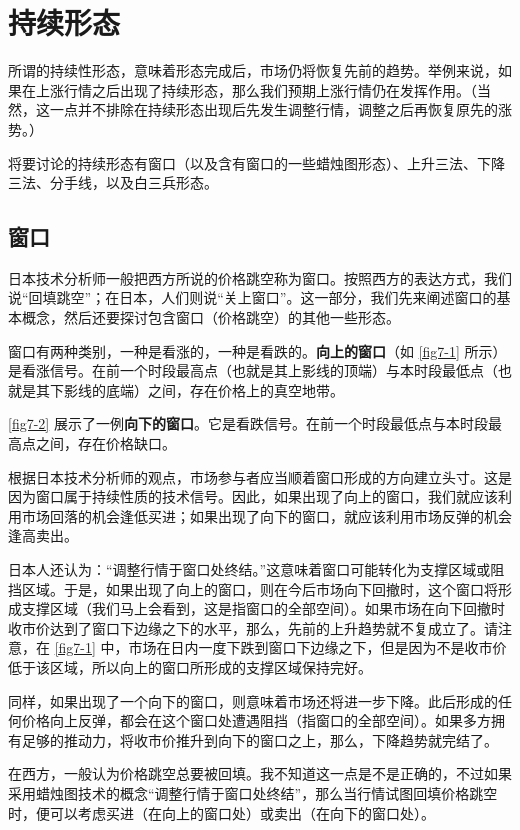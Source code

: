 \chapter{持续形态}
所谓的持续性形态，意味着形态完成后，市场仍将恢复先前的趋势。举例来说，如果在上涨行情之后出现了持续形态，那么我们预期上涨行情仍在发挥作用。（当然，这一点并不排除在持续形态出现后先发生调整行情，调整之后再恢复原先的涨势。）

将要讨论的持续形态有窗口（以及含有窗口的一些蜡烛图形态）、上升三法、下降三法、分手线，以及白三兵形态。

\section{窗口}
日本技术分析师一般把西方所说的价格跳空称为窗口。按照西方的表达方式，我们说“回填跳空”；在日本，人们则说“关上窗口”。这一部分，我们先来阐述窗口的基本概念，然后还要探讨包含窗口（价格跳空）的其他一些形态。

窗口有两种类别，一种是看涨的，一种是看跌的。\textbf{向上的窗口}（如 \autoref{fig7-1} 所示）是看涨信号。在前一个时段最高点（也就是其上影线的顶端）与本时段最低点（也就是其下影线的底端）之间，存在价格上的真空地带。


\autoref{fig7-2} 展示了一例\textbf{向下的窗口}。它是看跌信号。在前一个时段最低点与本时段最高点之间，存在价格缺口。


根据日本技术分析师的观点，市场参与者应当顺着窗口形成的方向建立头寸。这是因为窗口属于持续性质的技术信号。因此，如果出现了向上的窗口，我们就应该利用市场回落的机会逢低买进；如果出现了向下的窗口，就应该利用市场反弹的机会逢高卖出。

日本人还认为：“调整行情于窗口处终结。”这意味着窗口可能转化为支撑区域或阻挡区域。于是，如果出现了向上的窗口，则在今后市场向下回撤时，这个窗口将形成支撑区域（我们马上会看到，这是指窗口的全部空间）。如果市场在向下回撤时收市价达到了窗口下边缘之下的水平，那么，先前的上升趋势就不复成立了。请注意，在 \autoref{fig7-1} 中，市场在日内一度下跌到窗口下边缘之下，但是因为不是收市价低于该区域，所以向上的窗口所形成的支撑区域保持完好。

同样，如果出现了一个向下的窗口，则意味着市场还将进一步下降。此后形成的任何价格向上反弹，都会在这个窗口处遭遇阻挡（指窗口的全部空间）。如果多方拥有足够的推动力，将收市价推升到向下的窗口之上，那么，下降趋势就完结了。

在西方，一般认为价格跳空总要被回填。我不知道这一点是不是正确的，不过如果采用蜡烛图技术的概念“调整行情于窗口处终结”，那么当行情试图回填价格跳空时，便可以考虑买进（在向上的窗口处）或卖出（在向下的窗口处）。

